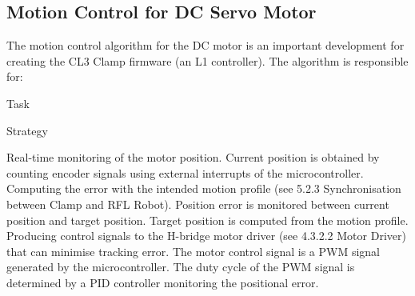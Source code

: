 \subsection{Motion Control for DC Servo Motor}
The motion control algorithm for the DC motor is an important development for creating the CL3 Clamp firmware (an L1 controller). The algorithm is responsible for:

Task

Strategy

Real-time monitoring of the motor position.
Current position is obtained by counting encoder signals using external interrupts of the microcontroller.
Computing the error with the intended motion profile (see 5.2.3 Synchronisation between Clamp and RFL Robot).
Position error is monitored between current position and target position. 
Target position is computed from the motion profile.
Producing control signals to the H-bridge motor driver (see 4.3.2.2 Motor Driver) that can minimise tracking error. 
The motor control signal is a PWM signal generated by the microcontroller. 
The duty cycle of the PWM signal is determined by a PID controller monitoring the positional error.

